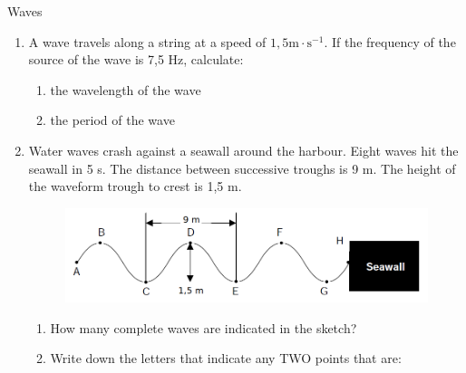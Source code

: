     \begin{eocexercises}{Waves}
            \nopagebreak
      \label{m38806*id324367}\begin{enumerate}[noitemsep, label=\textbf{\arabic*}. ] 
\label{m38806*uid128}\item A wave travels along a string at a speed of $1,5\text{m}\ensuremath{\cdot}\text{s}{}^{-1}$. If the frequency of the source of the wave is 7,5 Hz, calculate:
\label{m38806*id324525}\begin{enumerate}[noitemsep, label=\textbf{\alph*}. ] 
            \label{m38806*uid129}\item the wavelength of the wave
\label{m38806*uid130}\item the period of the wave
\end{enumerate}
                \item Water waves crash against a seawall around the harbour. Eight waves hit the seawall in 5 s. The distance between successive troughs is 9 m. The height of the waveform trough to crest is 1,5 m. 
    \setcounter{subfigure}{0}
	\begin{figure}[H] %
    \begin{center}
    \label{m38806*id634524!!!underscore!!!media}\label{m38806*id634524!!!underscore!!!printimage}\includegraphics[width=0.8\columnwidth]{col11305.imgs/m38806_seawall.png} %
    \end{center}
 \end{figure}       
\label{m38806*uid081231}\begin{enumerate}[noitemsep, label=\textbf{\alph*}. ] 
            \item How many complete waves are indicated in the sketch?\item Write down the letters that indicate any TWO points that are:

\end{enumerate}
\end{enumerate}
\end{eocexercises}
